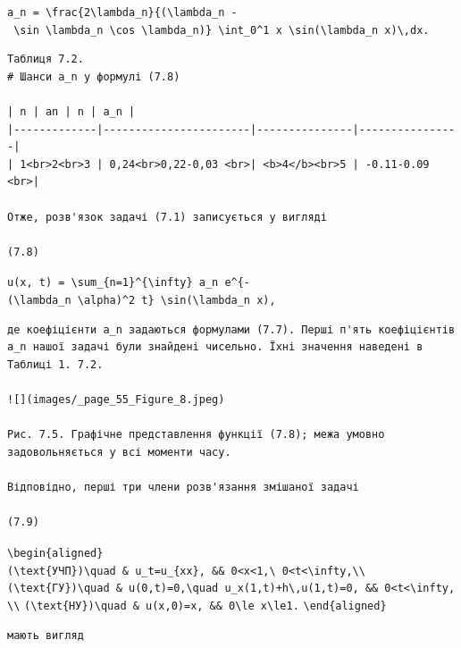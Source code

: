 \documentclass[
  ukrainian,
]{article}
\begin{document}
\texttt{a\_n\ =\ \textbackslash{}frac\{2\textbackslash{}lambda\_n\}\{(\textbackslash{}lambda\_n\ -\ \textbackslash{}sin\ \textbackslash{}lambda\_n\ \textbackslash{}cos\ \textbackslash{}lambda\_n)\}\ \textbackslash{}int\_0\^{}1\ x\ \textbackslash{}sin(\textbackslash{}lambda\_n\ x)\textbackslash{},dx.}

\begin{verbatim}
Таблиця 7.2.
# Шанси a_n у формулі (7.8)

| n | an | n | a_n |
|-------------|-----------------------|---------------|----------------|
| 1<br>2<br>3 | 0,24<br>0,22-0,03 <br>| <b>4</b><br>5 | -0.11-0.09 <br>|

Отже, розв'язок задачі (7.1) записується у вигляді

(7.8)
\end{verbatim}

\texttt{u(x,\ t)\ =\ \textbackslash{}sum\_\{n=1\}\^{}\{\textbackslash{}infty\}\ a\_n\ e\^{}\{-(\textbackslash{}lambda\_n\ \textbackslash{}alpha)\^{}2\ t\}\ \textbackslash{}sin(\textbackslash{}lambda\_n\ x),}

\begin{verbatim}
де коефіцієнти a_n задаються формулами (7.7). Перші п'ять коефіцієнтів a_n нашої задачі були знайдені чисельно. Їхні значення наведені в Таблиці 1. 7.2.

![](images/_page_55_Figure_8.jpeg)

Рис. 7.5. Графічне представлення функції (7.8); межа умовно задовольняється у всі моменти часу.

Відповідно, перші три члени розв'язання змішаної задачі

(7.9)
\end{verbatim}

\texttt{\textbackslash{}begin\{aligned\}}
\texttt{(\textbackslash{}text\{УЧП\})\textbackslash{}quad\ \&\ u\_t=u\_\{xx\},\ \&\&\ 0\textless{}x\textless{}1,\textbackslash{}\ 0\textless{}t\textless{}\textbackslash{}infty,\textbackslash{}\textbackslash{}}
\texttt{(\textbackslash{}text\{ГУ\})\textbackslash{}quad\ \&\ u(0,t)=0,\textbackslash{}quad\ u\_x(1,t)+h\textbackslash{},u(1,t)=0,\ \&\&\ 0\textless{}t\textless{}\textbackslash{}infty,\textbackslash{}\textbackslash{}}
\texttt{(\textbackslash{}text\{НУ\})\textbackslash{}quad\ \&\ u(x,0)=x,\ \&\&\ 0\textbackslash{}le\ x\textbackslash{}le1.}
\texttt{\textbackslash{}end\{aligned\}}

\begin{verbatim}
мають вигляд
\end{verbatim}
\end{document}
